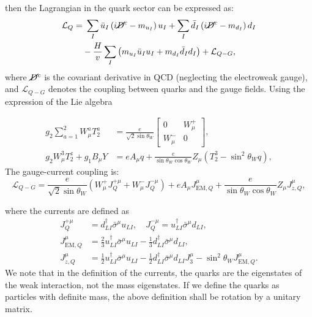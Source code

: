 \documentclass[aps,rmp,twocolumn,superscriptaddress,nofootinbib]{revtex4-2}
\begin{document}
then the Lagrangian in the quark sector can be expressed as:
\begin{equation*}
\begin{aligned}
	\mathcal L_Q =&\ \sum_I \bar u_I\left(i\cancel D^c-m_{u_I}\right)u_I + \sum_I \bar d_I \left(i \cancel D^c-m_{d_I}\right)d_I \\
	& -\frac{H}{v} \sum_I\left(m_{u_I}\bar u_I u_I+m_{d_I}\bar d_I d_I \right) + \mathcal L_{Q-G},
\end{aligned}
\end{equation*}
where $\cancel D^c$ is the covariant derivative in QCD (neglecting the electroweak gauge), and $\mathcal L_{Q-G}$ denotes the coupling between quarks and the gauge fields.
Using the expression of the Lie algebra
\begin{widetext}
\begin{equation}
\begin{aligned}
	g_2 \sum_{a=1}^2 W^a_\mu T^a_2 &= \frac{e}{\sqrt{2}\sin{\theta_W}}\begin{bmatrix}
		0 & W_\mu^+ \\ W_\mu^- & 0
	\end{bmatrix}, \\
	g_2 W_\mu^3 T^z_2 + g_1 B_\mu Y
	&= e A_\mu q + \frac{e}{\sin{\theta_W}\cos{\theta_W}} Z_\mu \left(T_2^3 - \sin^2{\theta_W} q\right),
\end{aligned}
\end{equation}
The gauge-current coupling is:
\begin{equation}
	\mathcal L_{Q-G} = \frac{e}{\sqrt{2}\sin{\theta_W}} \left(W^{+}_\mu J_Q^{+\mu} + W^{-}_\mu J_Q^{-\mu} \right) + e A_\mu J^{\mu}_{\mathrm{EM},Q} + \frac{e}{\sin{\theta_W}\cos{\theta_W}} Z_\mu J^\mu_{z,Q},
\end{equation}
\end{widetext}
where the currents are defined as
\begin{equation*}
\begin{aligned}
	J^{+\mu}_Q &= d_{LI}^\dagger \bar\sigma^\mu u_{LI}, \quad
	J^{-\mu}_Q = u_{LI}^\dagger \bar\sigma^\mu d_{LI}, \\
	J^\mu_{\mathrm{EM},Q} &= \frac{2}{3} u_{LI}^\dagger \bar\sigma^\mu u_{LI} - \frac{1}{3} d_{LI}^\dagger \bar\sigma^\mu d_{LI}, \\
	J_{z,Q}^\mu &= \frac{1}{2} u_{LI}^\dagger \bar\sigma^\mu u_{LI} - \frac{1}{2} d_{LI}^\dagger \bar\sigma^\mu d_{LI} J^\mu_3-\sin^2{\theta_W}J_{\mathrm{EM},Q}^\mu.
\end{aligned}
\end{equation*}
We note that in the definition of the currents, the quarks are the eigenstates of the weak interaction, not the mass eigenstates.
If we define the quarks as particles with definite mass, the above definition shall be rotation by a unitary matrix.
\end{document}

